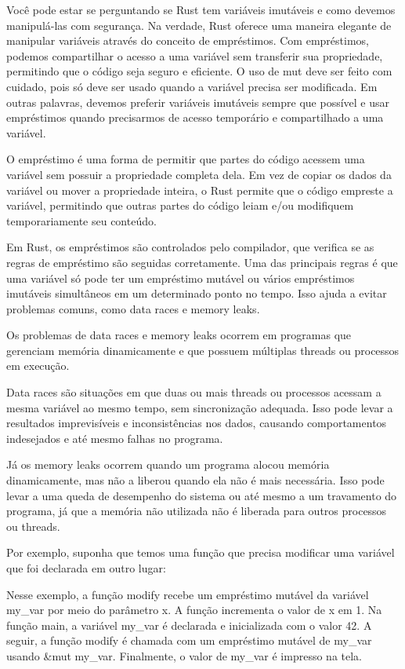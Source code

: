 \documentclass[12pt,a4paper,oneside]{abntex2}
\begin{document}
Você pode estar se perguntando se Rust tem variáveis imutáveis e como devemos manipulá-las com segurança. Na verdade, Rust oferece uma maneira elegante de manipular variáveis através do conceito de empréstimos. Com empréstimos, podemos compartilhar o acesso a uma variável sem transferir sua propriedade, permitindo que o código seja seguro e eficiente. O uso de mut deve ser feito com cuidado, pois só deve ser usado quando a variável precisa ser modificada. Em outras palavras, devemos preferir variáveis imutáveis sempre que possível e usar empréstimos quando precisarmos de acesso temporário e compartilhado a uma variável.

O empréstimo é uma forma de permitir que partes do código acessem uma variável sem possuir a propriedade completa dela. Em vez de copiar os dados da variável ou mover a propriedade inteira, o Rust permite que o código empreste a variável, permitindo que outras partes do código leiam e/ou modifiquem temporariamente seu conteúdo.

Em Rust, os empréstimos são controlados pelo compilador, que verifica se as regras de empréstimo são seguidas corretamente. Uma das principais regras é que uma variável só pode ter um empréstimo mutável ou vários empréstimos imutáveis simultâneos em um determinado ponto no tempo. Isso ajuda a evitar problemas comuns, como data races e memory leaks.

Os problemas de data races e memory leaks ocorrem em programas que gerenciam memória dinamicamente e que possuem múltiplas threads ou processos em execução.

Data races são situações em que duas ou mais threads ou processos acessam a mesma variável ao mesmo tempo, sem sincronização adequada. Isso pode levar a resultados imprevisíveis e inconsistências nos dados, causando comportamentos indesejados e até mesmo falhas no programa.

Já os memory leaks ocorrem quando um programa alocou memória dinamicamente, mas não a liberou quando ela não é mais necessária. Isso pode levar a uma queda de desempenho do sistema ou até mesmo a um travamento do programa, já que a memória não utilizada não é liberada para outros processos ou threads.


Por exemplo, suponha que temos uma função que precisa modificar uma variável que foi declarada em outro lugar:


Nesse exemplo, a função modify recebe um empréstimo mutável da variável my\_var por meio do parâmetro x. A função incrementa o valor de x em 1. Na função main, a variável my\_var é declarada e inicializada com o valor 42. A seguir, a função modify é chamada com um empréstimo mutável de my\_var usando \&mut my\_var. Finalmente, o valor de my\_var é impresso na tela.
\end{document}
